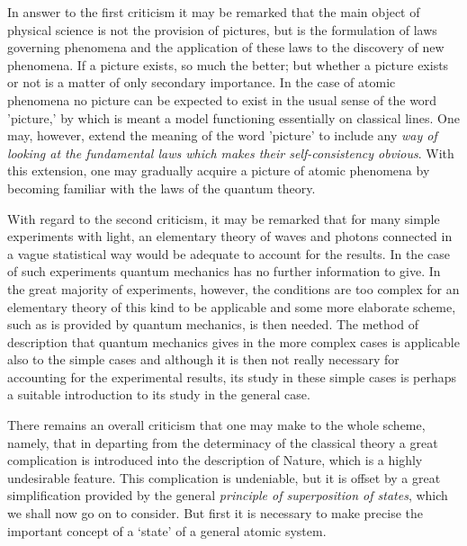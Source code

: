In answer to the first criticism it may be remarked that the main object of physical science is not the provision of pictures, but is the formulation of laws governing phenomena and the application of these laws to the discovery of new phenomena.  If a picture exists, so much the better; but whether a picture exists or not is a matter of only secondary importance.  In the case of atomic phenomena no picture can be expected to exist in the usual sense of the word 'picture,' by which is meant a model functioning essentially on classical lines.  One may, however, extend the meaning of the word 'picture' to include any \emph{way of looking at the fundamental laws which makes their self-consistency obvious}.  With this extension, one may gradually acquire a picture of atomic phenomena by becoming familiar with the laws of the quantum theory.

With regard to the second criticism, it may be remarked that for many simple experiments with light, an elementary theory of waves and photons connected in a vague statistical way would be adequate to account for the results.  In the case of such experiments quantum mechanics has no further information to give.  In the great majority of experiments, however, the conditions are too complex for an elementary theory of this kind to be applicable and some more elaborate scheme, such as is provided by quantum mechanics, is then needed.  The method of description that quantum mechanics gives in the more complex cases is applicable also to the simple cases and although it is then not really necessary for accounting for the experimental results, its study in these simple cases is perhaps a suitable introduction to its study in the general case.

There remains an overall criticism that one may make to the whole scheme, namely, that in departing from the determinacy of the classical theory a great complication is introduced into the description of Nature, which is a highly undesirable feature.  This complication is undeniable, but it is offset by a great simplification provided by the general \emph{principle of superposition of states}, which we shall now go on to consider.  But first it is necessary to make precise the important concept of a `state' of a general atomic system.

